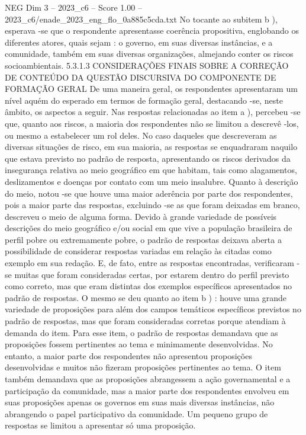 \begin{textsample}{NEG Dim 3 – 2023\_c6 – Score 1.00 – 2023\_c6/enade\_2023\_eng\_flo\_0a885c5cda.txt}
No tocante ao subitem b ), esperava -se que o respondente apresentasse coerência propositiva, englobando os diferentes atores, quais sejam : o governo, em suas diversas instâncias, e a comunidade, também em suas diversas organizações, almejando conter os riscos socioambientais. 5.3.1.3 CONSIDERAÇÕES FINAIS SOBRE A CORREÇÃO DE CONTEÚDO DA QUESTÃO DISCURSIVA DO COMPONENTE DE FORMAÇÃO GERAL De uma maneira geral, os respondentes apresentaram um nível aquém do esperado em termos de formação geral, destacando -se, neste âmbito, os aspectos a seguir.
Nas respostas relacionadas ao item a ), percebeu -se que, quanto aos riscos, a maioria dos respondentes não se limitou a descrevê -los, ou mesmo a estabelecer um rol deles.
No caso daqueles que descreveram as diversas situações de risco, em sua maioria, as respostas se enquadraram naquilo que estava previsto no padrão de resposta, apresentando os riscos derivados da insegurança relativa ao meio geográfico em que habitam, tais como alagamentos, deslizamentos e doenças por contato com um meio insalubre.
Quanto à descrição do meio, notou -se que houve uma maior aderência por parte dos respondentes, pois a maior parte das respostas, excluindo -se as que foram deixadas em branco, descreveu o meio de alguma forma.
Devido à grande variedade de possíveis descrições do meio geográfico e/ou social em que vive a população brasileira de perfil pobre ou extremamente pobre, o padrão de respostas deixava aberta a possibilidade de considerar respostas variadas em relação às citadas como exemplo em sua redação.
E, de fato, entre as respostas encontradas, verificaram -se muitas que foram consideradas certas, por estarem dentro do perfil previsto como correto, mas que eram distintas dos exemplos específicos apresentados no padrão de respostas.
O mesmo se deu quanto ao item b ) : houve uma grande variedade de proposições para além dos campos temáticos específicos previstos no padrão de respostas, mas que foram consideradas corretas porque atendiam à demanda do item.
Para esse item, o padrão de respostas demandava que as proposições fossem pertinentes ao tema e minimamente desenvolvidas.
No entanto, a maior parte dos respondentes não apresentou proposições desenvolvidas e muitos não fizeram proposições pertinentes ao tema.
O item também demandava que as proposições abrangessem a ação governamental e a participação da comunidade, mas a maior parte dos respondentes envolveu em suas proposições apenas os governos em suas mais diversas instâncias, não abrangendo o papel participativo da comunidade.
Um pequeno grupo de respostas se limitou a apresentar só uma proposição.

\end{textsample}
